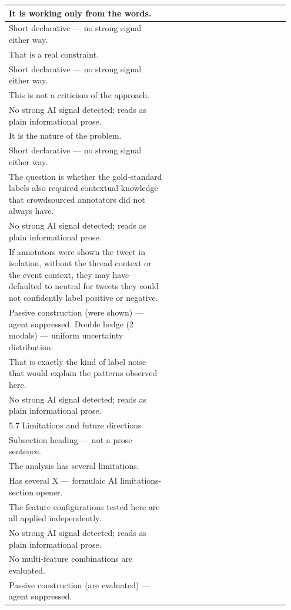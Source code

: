 \documentclass[11pt]{article}
\begin{document}
\begin{longtable}{|p{0.55\linewidth}|p{0.40\linewidth}|}
\hline
It is working only from the words. & \\[2pt]
\hline
Short declarative --- no strong signal either way. & \\
\hline
That is a real constraint. & \\[2pt]
\hline
Short declarative --- no strong signal either way. & \\
\hline
This is not a criticism of the approach. & \\[2pt]
\hline
No strong AI signal detected; reads as plain informational prose. & \\
\hline
It is the nature of the problem. & \\[2pt]
\hline
Short declarative --- no strong signal either way. & \\
\hline
The question is whether the gold-standard labels also required contextual knowledge that crowdsourced annotators did not always have. & \\[2pt]
\hline
No strong AI signal detected; reads as plain informational prose. & \\
\hline
If annotators were shown the tweet in isolation, without the thread context or the event context, they may have defaulted to neutral for tweets they could not confidently label positive or negative. & \\[2pt]
\hline
Passive construction (were shown) --- agent suppressed. Double hedge (2 modals) --- uniform uncertainty distribution. & \\
\hline
That is exactly the kind of label noise that would explain the patterns observed here. & \\[2pt]
\hline
No strong AI signal detected; reads as plain informational prose. & \\
\hline
5.7 Limitations and future directions & \\[2pt]
\hline
Subsection heading --- not a prose sentence. & \\
\hline
The analysis has several limitations. & \\[2pt]
\hline
Has several X --- formulaic AI limitations-section opener. & \\
\hline
The feature configurations tested here are all applied independently. & \\[2pt]
\hline
No strong AI signal detected; reads as plain informational prose. & \\
\hline
No multi-feature combinations are evaluated. & \\[2pt]
\hline
Passive construction (are evaluated) --- agent suppressed. & \\

\end{longtable}
\end{document}
